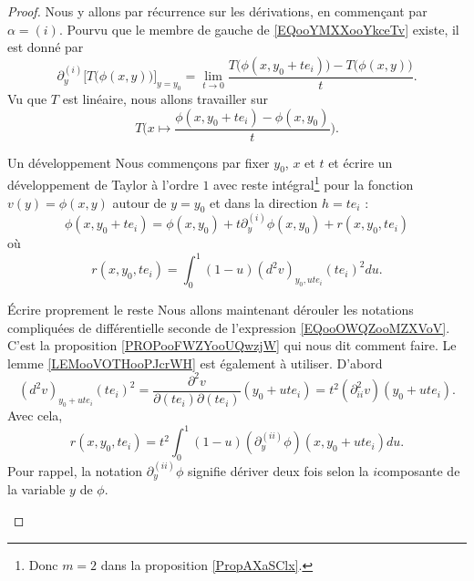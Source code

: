 \begin{proof}
    Nous y allons par récurrence sur les dérivations, en commençant par \( \alpha=(i)\). Pourvu que le membre de gauche de \eqref{EQooYMXXooYkceTv} existe, il est donné par
    \begin{equation}        \label{EQooBHSSooXDrYQh}
        \partial_y^{(i)}\big[ T\big( \phi(x,y) \big) \big]_{y=y_0}=\lim_{t\to 0} \frac{ T\big( \phi(x,y_0+te_i) \big)-T\big( \phi(x,y) \big) }{ t }.
    \end{equation}
    Vu que \( T\) est linéaire, nous allons travailler sur
    \begin{equation}        \label{EQooXEFAooNzLBZx}
        T\Big(x\mapsto \frac{ \phi(x,y_0+te_i)-\phi(x,y_0)}{t} \Big).
    \end{equation}
    \begin{subproof}
        \item[Un développement]
            Nous commençons par fixer \( y_0\), \( x\) et \( t\) et écrire un développement de Taylor à l'ordre \( 1\) avec reste intégral\footnote{Donc \( m=2\) dans la proposition \ref{PropAXaSClx}.} pour la fonction \( v(y)=\phi(x,y)\) autour de \( y=y_0\) et dans la direction \( h=te_i\) :
            \begin{equation}        \label{EQooBMYMooAjrTGH}
                \phi(x,y_0+te_i)=\phi(x,y_0)+t\partial_y^{(i)}\phi(x,y_0)+r(x,y_0,te_i)
            \end{equation}
            où
            \begin{equation}        \label{EQooOWQZooMZXVoV}
                r(x,y_0,te_i)=\int_0^1(1-u)(d^2v)_{y_0,ute_i}(te_i)^2du.
            \end{equation}
        \item[Écrire proprement le reste]
            Nous allons maintenant dérouler les notations compliquées de différentielle seconde de l'expression \eqref{EQooOWQZooMZXVoV}. C'est la proposition \ref{PROPooFWZYooUQwzjW} qui nous dit comment faire. Le lemme \ref{LEMooVOTHooPJcrWH} est également à utiliser. D'abord
            \begin{equation}
                (d^2v)_{y_0+ute_i}(te_i)^2=\frac{ \partial^2v }{ \partial(te_i)\partial(te_i) }(y_0+ute_i)=t^2(\partial^2_{ii}v)(y_0+ute_i).
            \end{equation}
            Avec cela,
            \begin{equation}        \label{EQooLIBWooYJshbY}
                r(x,y_0,te_i)=t^2\int_0^1(1-u)(\partial_y^{(ii)}\phi)(x,y_0+ute_i)du.
            \end{equation}
            Pour rappel, la notation \( \partial_y^{(ii)}\phi\) signifie dériver deux fois selon la \( i\)\ieme composante de la variable \( y\) de \( \phi\).


\end{subproof}
\end{proof}
